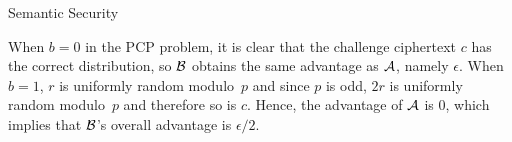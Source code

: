 \begin{bparagraph}{Semantic Security}
\begin{capsproof}
		When $b=0$ in the PCP problem, it is clear that the challenge ciphertext $c$ has the correct distribution, so $\mathcal{B}$ obtains the same advantage as $\mathcal{A}$, namely $\epsilon$.
		When $b=1$, $r$ is uniformly random modulo~$p$ and since $p$ is odd, $2r$ is uniformly random modulo~$p$ and therefore so is $c$.
		Hence, the advantage of $\mathcal{A}$ is 0, which implies that $\mathcal{B}$'s overall advantage is $\epsilon/2$.
	\end{capsproof}
\end{bparagraph}